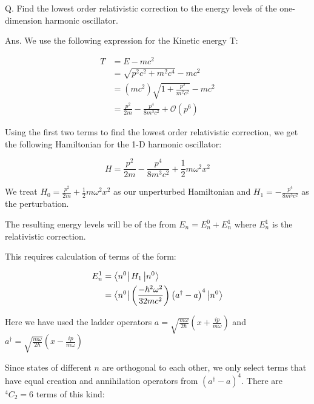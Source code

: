 Q. Find the lowest order relativistic correction to the energy levels of the
one-dimension harmonic oscillator.

Ans. We use the following expression for the Kinetic energy T:

\begin{equation}
    \begin{split}
        T &= E - mc^2\\
        &= \sqrt{p^2c^2 + m^2c^4} - mc^2\\
        &= \left( mc^2 \right) \sqrt{1+ \frac{p^2}{m^2c^2}} - mc^2\\
        &= \frac{p^2}{2m} - \frac{p^4}{8m^3c^2} + \mathcal{O}(p^6) 
    \end{split}
\end{equation}

Using the first two terms to find the lowest order relativistic correction, we get the following Hamiltonian for the 1-D harmonic oscillator:

\begin{equation}
H = \frac{p^2}{2m} - \frac{p^4}{8m^3c^2} + \frac{1}{2}m \omega^2 x^2
\end{equation}

We treat $H_0 = \frac{p^2}{2m}+ \frac{1}{2}m \omega^2 x^2$ as our unperturbed Hamiltonian and $H_1 =  - \frac{p^4}{8m^3c^2}$ as the perturbation. 

The resulting energy levels will be of the from $E_n = E^0_n + E^1_n$ where $E^1_n$ is the relativistic correction.

This requires calculation of terms of the form:

\begin{equation}
\begin{split}
    E^1_n &= \bra{n^0} H_1 \ket{n^0}\\
    &= \bra{n^0} \left( \frac{-\hbar^2 \omega^2}{32 m c^2} \right) \left( a^\dagger - a\right)^4  \ket{n^0}\\
\end{split}
\end{equation}

Here we have used the ladder operators $a = \sqrt{\frac{m \omega}{2 \hbar}} \left( x + \frac{ip}{m \omega} \right)$ and $a^\dagger = \sqrt{\frac{m \omega}{2 \hbar}} \left( x - \frac{ip}{m \omega} \right)$

Since states of different $n$ are orthogonal to each other, we only select terms that have equal creation and annihilation operators from $(a^\dagger - a)^4$. There are $^4 C_2 = 6$ terms of this kind:

